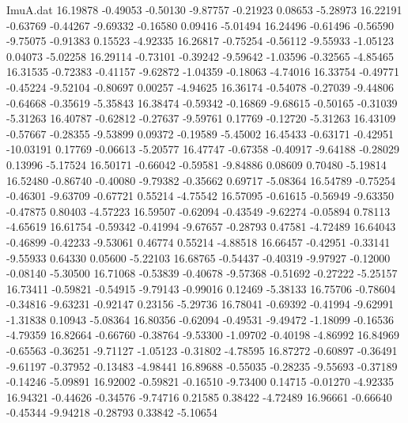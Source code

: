 \begin{filecontents}{ImuA.dat}
  16.19878   -0.49053   -0.50130   -9.87757   -0.21923    0.08653   -5.28973
  16.22191   -0.63769   -0.44267   -9.69332   -0.16580    0.09416   -5.01494
  16.24496   -0.61496   -0.56590   -9.75075   -0.91383    0.15523   -4.92335
  16.26817   -0.75254   -0.56112   -9.55933   -1.05123    0.04073   -5.02258
  16.29114   -0.73101   -0.39242   -9.59642   -1.03596   -0.32565   -4.85465
  16.31535   -0.72383   -0.41157   -9.62872   -1.04359   -0.18063   -4.74016
  16.33754   -0.49771   -0.45224   -9.52104   -0.80697    0.00257   -4.94625
  16.36174   -0.54078   -0.27039   -9.44806   -0.64668   -0.35619   -5.35843
  16.38474   -0.59342   -0.16869   -9.68615   -0.50165   -0.31039   -5.31263
  16.40787   -0.62812   -0.27637   -9.59761    0.17769   -0.12720   -5.31263
  16.43109   -0.57667   -0.28355   -9.53899    0.09372   -0.19589   -5.45002
  16.45433   -0.63171   -0.42951  -10.03191    0.17769   -0.06613   -5.20577
  16.47747   -0.67358   -0.40917   -9.64188   -0.28029    0.13996   -5.17524
  16.50171   -0.66042   -0.59581   -9.84886    0.08609    0.70480   -5.19814
  16.52480   -0.86740   -0.40080   -9.79382   -0.35662    0.69717   -5.08364
  16.54789   -0.75254   -0.46301   -9.63709   -0.67721    0.55214   -4.75542
  16.57095   -0.61615   -0.56949   -9.63350   -0.47875    0.80403   -4.57223
  16.59507   -0.62094   -0.43549   -9.62274   -0.05894    0.78113   -4.65619
  16.61754   -0.59342   -0.41994   -9.67657   -0.28793    0.47581   -4.72489
  16.64043   -0.46899   -0.42233   -9.53061    0.46774    0.55214   -4.88518
  16.66457   -0.42951   -0.33141   -9.55933    0.64330    0.05600   -5.22103
  16.68765   -0.54437   -0.40319   -9.97927   -0.12000   -0.08140   -5.30500
  16.71068   -0.53839   -0.40678   -9.57368   -0.51692   -0.27222   -5.25157
  16.73411   -0.59821   -0.54915   -9.79143   -0.99016    0.12469   -5.38133
  16.75706   -0.78604   -0.34816   -9.63231   -0.92147    0.23156   -5.29736
  16.78041   -0.69392   -0.41994   -9.62991   -1.31838    0.10943   -5.08364
  16.80356   -0.62094   -0.49531   -9.49472   -1.18099   -0.16536   -4.79359
  16.82664   -0.66760   -0.38764   -9.53300   -1.09702   -0.40198   -4.86992
  16.84969   -0.65563   -0.36251   -9.71127   -1.05123   -0.31802   -4.78595
  16.87272   -0.60897   -0.36491   -9.61197   -0.37952   -0.13483   -4.98441
  16.89688   -0.55035   -0.28235   -9.55693   -0.37189   -0.14246   -5.09891
  16.92002   -0.59821   -0.16510   -9.73400    0.14715   -0.01270   -4.92335
  16.94321   -0.44626   -0.34576   -9.74716    0.21585    0.38422   -4.72489
  16.96661   -0.66640   -0.45344   -9.94218   -0.28793    0.33842   -5.10654

\end{filecontents}
